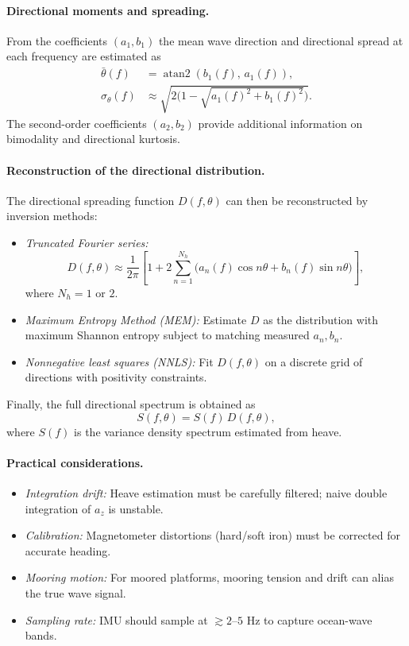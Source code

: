 \documentclass[11pt,letterpaper]{article}
\begin{document}
\paragraph{Directional moments and spreading.}
From the coefficients $(a_1,b_1)$ the mean wave direction and directional spread at each frequency are estimated as
\begin{align}
\bar{\theta}(f) &= \operatorname{atan2}(b_1(f),\,a_1(f)), \\
\sigma_\theta(f) &\approx \sqrt{2\Big(1 - \sqrt{a_1(f)^2 + b_1(f)^2}\Big)}.
\end{align}
The second-order coefficients $(a_2,b_2)$ provide additional information on bimodality and directional kurtosis.

\paragraph{Reconstruction of the directional distribution.}
The directional spreading function $D(f,\theta)$ can then be reconstructed by inversion methods:
\begin{itemize}
  \item \emph{Truncated Fourier series:}
  \begin{equation}
  D(f,\theta) \approx \frac{1}{2\pi}\left[1 + 2\sum_{n=1}^{N_h}\big(a_n(f)\cos n\theta + b_n(f)\sin n\theta\big)\right],
  \end{equation}
  where $N_h=1$ or $2$.
  \item \emph{Maximum Entropy Method (MEM):} Estimate $D$ as the distribution with maximum Shannon entropy subject to matching measured $a_n,b_n$.
  \item \emph{Nonnegative least squares (NNLS):} Fit $D(f,\theta)$ on a discrete grid of directions with positivity constraints.
\end{itemize}
Finally, the full directional spectrum is obtained as
\begin{equation}
S(f,\theta) = S(f)\, D(f,\theta),
\end{equation}
where $S(f)$ is the variance density spectrum estimated from heave.

\paragraph{Practical considerations.}
\begin{itemize}
  \item \emph{Integration drift:} Heave estimation must be carefully filtered; naive double integration of $a_z$ is unstable.
  \item \emph{Calibration:} Magnetometer distortions (hard/soft iron) must be corrected for accurate heading.
  \item \emph{Mooring motion:} For moored platforms, mooring tension and drift can alias the true wave signal.
  \item \emph{Sampling rate:} IMU should sample at $\gtrsim 2$--$5$ Hz to capture ocean-wave bands.
\end{itemize}
\end{document}
